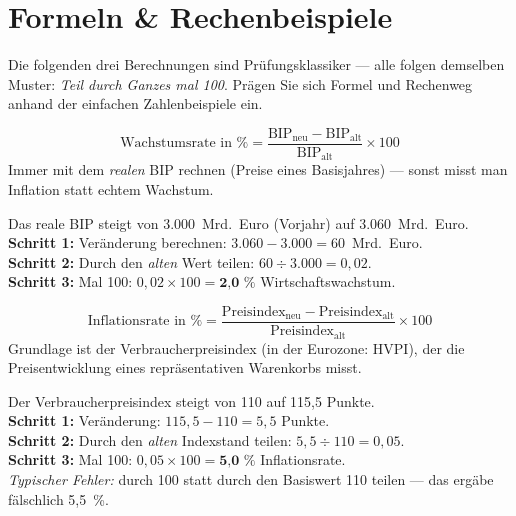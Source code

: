 \documentclass[11pt, a4paper]{article}
\begin{document}
\section{Formeln \& Rechenbeispiele}

Die folgenden drei Berechnungen sind Prüfungsklassiker --- alle folgen demselben Muster:
\emph{Teil durch Ganzes mal 100}. Prägen Sie sich Formel und Rechenweg anhand der
einfachen Zahlenbeispiele ein.

\begin{merksatz}[title={\bfseries Formel 1: Wirtschaftswachstum (Veränderungsrate des realen BIP)}]
\[
\text{Wachstumsrate in \%} =
\frac{\text{BIP}_{\text{neu}} - \text{BIP}_{\text{alt}}}{\text{BIP}_{\text{alt}}} \times 100
\]
Immer mit dem \emph{realen} BIP rechnen (Preise eines Basisjahres) --- sonst misst man
Inflation statt echtem Wachstum.
\end{merksatz}

\begin{beispiel}
Das reale BIP steigt von 3.000~Mrd.~Euro (Vorjahr) auf 3.060~Mrd.~Euro.\\[0.3em]
\textbf{Schritt 1:} Veränderung berechnen: $3.060 - 3.000 = 60$~Mrd.~Euro.\\
\textbf{Schritt 2:} Durch den \emph{alten} Wert teilen: $60 \div 3.000 = 0{,}02$.\\
\textbf{Schritt 3:} Mal 100: $0{,}02 \times 100 = \textbf{2{,}0~\%}$ Wirtschaftswachstum.
\end{beispiel}

\begin{merksatz}[title={\bfseries Formel 2: Inflationsrate (Veränderungsrate des Preisindex)}]
\[
\text{Inflationsrate in \%} =
\frac{\text{Preisindex}_{\text{neu}} - \text{Preisindex}_{\text{alt}}}{\text{Preisindex}_{\text{alt}}} \times 100
\]
Grundlage ist der Verbraucherpreisindex (in der Eurozone: HVPI), der die Preisentwicklung
eines repräsentativen Warenkorbs misst.
\end{merksatz}

\begin{beispiel}
Der Verbraucherpreisindex steigt von 110 auf 115,5 Punkte.\\[0.3em]
\textbf{Schritt 1:} Veränderung: $115{,}5 - 110 = 5{,}5$ Punkte.\\
\textbf{Schritt 2:} Durch den \emph{alten} Indexstand teilen: $5{,}5 \div 110 = 0{,}05$.\\
\textbf{Schritt 3:} Mal 100: $0{,}05 \times 100 = \textbf{5{,}0~\%}$ Inflationsrate.\\[0.3em]
\emph{Typischer Fehler:} durch 100 statt durch den Basiswert 110 teilen --- das ergäbe
fälschlich 5,5~\%.
\end{beispiel}
\end{document}
